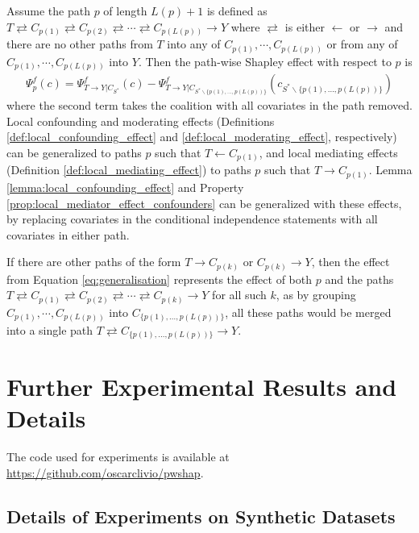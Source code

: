 \documentclass{article}
\theoremstyle{plain}
\theoremstyle{definition}
\theoremstyle{remark}
\newcommand{\effect}{\Psi}
\theoremstyle{mystyle}
\begin{document}
Assume the path $p$ of length $L(p)+1$ is defined as $T \rightleftarrows C_{p(1)} \rightleftarrows C_{p(2)} \rightleftarrows \cdots \rightleftarrows C_{p(L(p))} \rightarrow Y$ where $\rightleftarrows $ is either $\leftarrow$ or $\rightarrow$ and there are no other paths from $T$ into any of $C_{p(1)}, \cdots, C_{p(L(p))}$ or from any of $C_{p(1)}, \cdots, C_{p(L(p))}$ into $Y$. Then the path-wise Shapley effect with respect to $p$ is 
\begin{align}
\label{eq:generalisation}
\effect^f_p(c) = \effect^f_{ T \rightarrow Y | C_{S^*}}(c) - \effect^f_{ T \rightarrow Y | C_{S^*\backslash \{p(1), ..., p(L(p))\} }}(c_{S^*\backslash \{p(1), ..., p(L(p))\}})
\end{align}
where the second term takes the coalition with all covariates in the path removed. Local confounding and moderating effects (Definitions \ref{def:local_confounding_effect} and \ref{def:local_moderating_effect}, respectively) can be generalized to paths $p$ such that $T \leftarrow C_{p(1)}$, and local mediating effects (Definition \ref{def:local_mediating_effect}) to paths $p$ such that $T \rightarrow C_{p(1)}$.
Lemma \ref{lemma:local_confounding_effect} and Property \ref{prop:local_mediator_effect_confounders} can be generalized with these effects, by replacing covariates in the conditional independence statements with all covariates in either path.

If there are other paths of the form $T \rightarrow C_{p(k)}$ or $C_{p(k)} \rightarrow Y$, then the effect from Equation \ref{eq:generalisation} represents the effect of both $p$ and the paths $T \rightleftarrows C_{p(1)} \rightleftarrows C_{p(2)} \rightleftarrows \cdots \rightleftarrows C_{p(k)} \rightarrow Y$ for all such $k$, as by grouping $C_{p(1)}, \cdots, C_{p(L(p))}$ into $C_{\{p(1), ..., p(L(p))\}}$, all these paths would be merged into a single path $T \rightleftarrows C_{\{p(1), ..., p(L(p))\}} \rightarrow Y$.

\section{Further Experimental Results and Details}
\label{sec:exp_details}

The code used for experiments is available at \url{https://github.com/oscarclivio/pwshap}.

\subsection{Details of Experiments on Synthetic Datasets}
\end{document}

